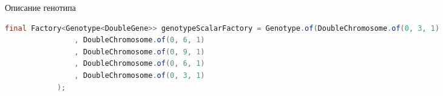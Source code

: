 		\begin{ListingEnv}[H]%
			\caption{Описание генотипа}
			\label{list:hwbeauty}
			\begin{lstlisting}[language={Java}]
			final Factory<Genotype<DoubleGene>> genotypeScalarFactory = Genotype.of(DoubleChromosome.of(0, 3, 1)
				, DoubleChromosome.of(0, 6, 1)
				, DoubleChromosome.of(0, 9, 1)
				, DoubleChromosome.of(0, 6, 1)
				, DoubleChromosome.of(0, 3, 1)
			);
			\end{lstlisting}
		\end{ListingEnv}%
	
	\subsection{}
	